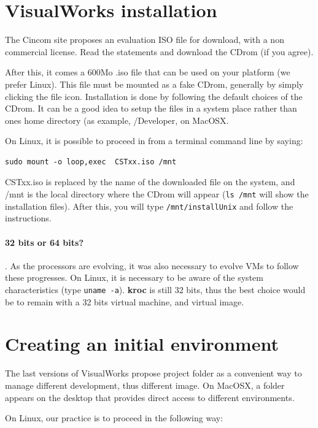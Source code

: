 \documentclass[times]{book}
\begin{document}
\section{VisualWorks installation}

The Cincom site proposes an evaluation ISO file for download, with a non commercial
license. Read the statements and download the CDrom (if you agree).

After this, it comes a 600Mo .iso file that can be used on your platform (we prefer Linux).
This file must be mounted as a fake CDrom, generally by simply clicking the file icon.
Installation is done by following the default choices of the CDrom. It can be 
a good idea to setup the files in a system place rather than ones home directory
(as example, /Developer, on MacOSX.

On Linux, it is possible to proceed in from a terminal command  line by saying:

\begin{verbatim}  
sudo mount -o loop,exec  CSTxx.iso /mnt
\end{verbatim}

CSTxx.iso is replaced by the name of the downloaded file on the system, and /mnt is the local
directory where the CDrom will appear ({\tt ls /mnt} will show the installation files). After
this, you will type {\tt /mnt/installUnix} and follow the instructions.

\paragraph{32 bits or 64 bits?}. As the processors are evolving, it was also necessary
to evolve VMs to follow these progresses. On Linux, it is necessary to be aware
of the system characteristics (type {\tt uname -a}). {\bf kroc} is still 32 bits, thus
the best choice would be to remain with a 32 bits virtual machine, and virtual image.


\section {Creating an initial environment }
\label{sec:initialEnv}
The last versions of VisualWorks propose project folder as a convenient way 
to manage different development, thus different image. On MacOSX,
a folder appears on the desktop that provides direct access to different environments.

On Linux, our practice is to proceed in the following way:
\end{document}
